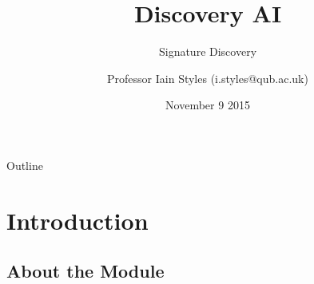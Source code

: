 \documentclass[aspectratio=169]{beamer}
\begin{document}
    \title{Discovery AI}
    \subtitle{Signature Discovery}
    \author{Professor Iain Styles (i.styles@qub.ac.uk)}
    \date{November 9 2015}

\begin{frame}
  \titlepage
\end{frame}

\begin{frame}{Outline}
  \tableofcontents
\end{frame}

\section{Introduction}
\subsection{About the Module}
\end{document}
